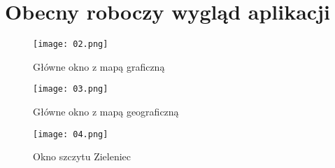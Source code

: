 \documentclass[10pt, a4paper]{article}
\begin{document}
\newpage
\section{Obecny roboczy wygląd aplikacji} 
	\begin{figure}[!h]
	\centering
	\texttt{[image: 02.png]}
	\caption{Główne okno z mapą graficzną}
	\end{figure}
	
	\begin{figure}[!h]
	\centering
	\texttt{[image: 03.png]}
	\caption{Główne okno z mapą geograficzną}
	\end{figure}
	\begin{figure}[!h]
	\centering
	\texttt{[image: 04.png]}
	\caption{Okno szczytu Zieleniec}
	\end{figure}
\newpage
\newpage
\newpage
\end{document}
